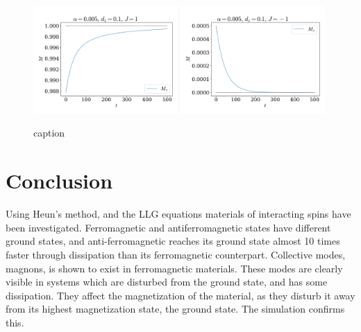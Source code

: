 \documentclass{article}
\begin{document}
    \begin{figure}
        \centering
        \includegraphics[width=0.49\textwidth]{../plots/mag.pdf}
        \includegraphics[width=0.49\textwidth]{../plots/mag2.pdf}
        \caption{caption}
        \label{mag}
    \end{figure}

    \section*{Conclusion}
    Using Heun's method, and the LLG equations materials of interacting spins have been investigated. Ferromagnetic and antiferromagnetic states have different ground states, and anti-ferromagnetic reaches its ground state almost 10 times faster through dissipation than its ferromagnetic counterpart. Collective modes, magnons, is shown to exist in ferromagnetic materials. These modes are clearly visible in systems which are disturbed from the ground state, and has some dissipation. They affect the magnetization of the material, as they disturb it away from its highest magnetization state, the ground state. The simulation confirms this. 

    
    
\end{document}
